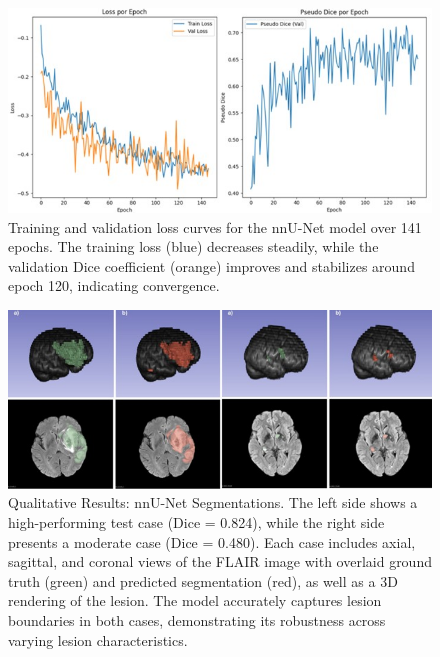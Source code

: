 \documentclass[12pt]{article}
\begin{document}
\begin{figure}[tp]
    \centering
    \includegraphics[width=\textwidth]{figures/Figure 3.jpg}
    \caption{Training and validation loss curves for the nnU-Net model over 141 epochs. The training loss (blue) decreases steadily, while the validation Dice coefficient (orange) improves and stabilizes around epoch 120, indicating convergence.}\label{fig:nnu-net_loss_curve}
\end{figure}


\begin{figure}[tp]    
    \centering
    \includegraphics[width=\textwidth]{figures/Figure 4.jpg}
    \caption{Qualitative Results: nnU-Net Segmentations. The left side shows a high-performing test case (Dice = 0.824), while the right side presents a moderate case (Dice = 0.480). Each case includes axial, sagittal, and coronal views of the FLAIR image with overlaid ground truth (green) and predicted segmentation (red), as well as a 3D rendering of the lesion. The model accurately captures lesion boundaries in both cases, demonstrating its robustness across varying lesion characteristics.}
    \label{fig:nnunet_qualitative}
\end{figure}
\end{document}
